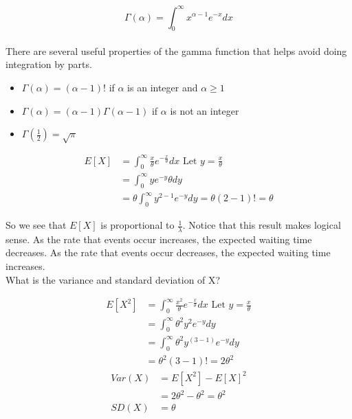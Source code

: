 \documentclass[12pt, letterpaper]{article}
\begin{document}
\begin{equation}
\Gamma \left(\alpha\right) = \int_{0}^{\infty} x^{\alpha - 1} e^{-x} dx
\end{equation}\\

There are several useful properties of the gamma function that helps avoid doing integration by parts.
\begin{itemize}
\item \(\Gamma \left(\alpha\right) = (\alpha - 1)!\) if \(\alpha\) is an integer and \(\alpha \geq 1\)
\item \(\Gamma \left(\alpha\right) = (\alpha - 1) \Gamma \left(\alpha - 1\right)\) if \(\alpha\) is not an integer
\item \(\Gamma \left(\frac{1}{2}\right) = \sqrt{\pi}\)
\end{itemize}

\begin{align*}
E[X] &= \int_{0}^{\infty} \frac{x}{\theta} e^{-\frac{x}{\theta}} dx \text{ Let $y = \frac{x}{\theta}$}\\
&= \int_{0}^{\infty} y e^{-y} \theta dy\\
&= \theta \int_{0}^{\infty} y^{2 - 1} e^{-y} dy = \theta (2 - 1)! = \theta
\end{align*}

So we see that \(E[X]\) is proportional to \(\frac{1}{\lambda}\). Notice that this result makes logical sense. As the rate that events occur increases, the expected waiting time decreases. As the rate that events occur decreases, the expected waiting time increases.\\

What is the variance and standard deviation of X?

\begin{align*}
E[X^2] &= \int_{0}^{\infty} \frac{x^2}{\theta} e^{-\frac{x}{\theta}} dx \text{ Let $y = \frac{x}{\theta}$}\\
&= \int_{0}^{\infty} \theta^2 y^2 e^{-y} dy\\
&= \int_{0}^{\infty} \theta^2 y^{(3 - 1)} e^{-y} dy\\
&= \theta^2 (3 - 1)! = 2\theta^2
\end{align*}
\begin{align*}
Var\left(X\right) &= E[X^2] - E[X]^2\\
&= 2\theta^2 - \theta^2 = \theta^2\\
SD\left(X\right) &= \theta
\end{align*}\\
\end{document}
